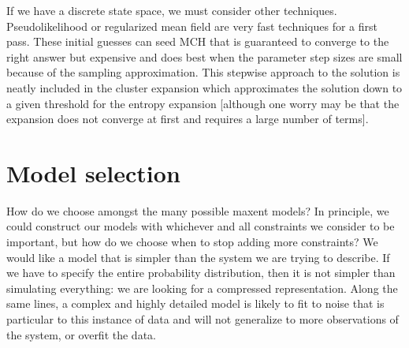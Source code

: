 \documentclass[aps,prl,twocolumn]{revtex4-1}
\begin{document}
If we have a discrete state space, we must consider other techniques. Pseudolikelihood or regularized mean field are very fast techniques for a first pass. These initial guesses can seed MCH that is guaranteed to converge to the right answer but expensive and does best when the parameter step sizes are small because of the sampling approximation. This stepwise approach to the solution is neatly included in the cluster expansion which approximates the solution down to a given threshold for the entropy expansion [although one worry may be that the expansion does not converge at first and requires a large number of terms]. 

\section{Model selection}

How do we choose amongst the many possible maxent models? In principle, we could construct our models with whichever and all constraints we consider to be important, but how do we choose when to stop adding more constraints?
We would like a model that is simpler than the system we are trying to describe. If we have to specify the entire probability distribution, then it is not simpler than simulating everything: we are looking for a compressed representation. Along the same lines, a complex and highly detailed model is likely to fit to noise that is particular to this instance of data and will not generalize to more observations of the system, or overfit the data.
\end{document}
